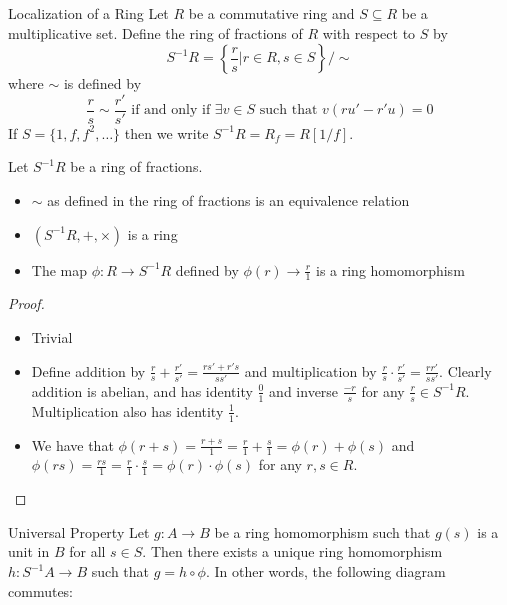 \documentclass[a4paper]{article}
\begin{document}
\begin{defn}{Localization of a Ring}{} Let $R$ be a commutative ring and $S\subseteq R$ be a multiplicative set. Define the ring of fractions of $R$ with respect to $S$ by $$S^{-1}R=\left\{\frac{r}{s}|r\in R,s\in S\right\}/\sim$$ where $\sim$ is defined by $$\frac{r}{s}\sim\frac{r'}{s'}\text{ if and only if }\exists v\in S\text{ such that }v(ru'-r'u)=0$$
If $S=\{1,f,f^2,\dots\}$ then we write $S^{-1}R=R_f=R[1/f]$. 
\end{defn}

\begin{prp}{}{} Let $S^{-1}R$ be a ring of fractions. 
\begin{itemize}
\item $\sim$ as defined in the ring of fractions is an equivalence relation
\item $(S^{-1}R,+,\times)$ is a ring
\item The map $\phi:R\to S^{-1}R$ defined by $\phi(r)\to\frac{r}{1}$ is a ring homomorphism
\end{itemize}\tcbline
\begin{proof}~\\
\begin{itemize}
\item Trivial
\item Define addition by $\frac{r}{s}+\frac{r'}{s'}=\frac{rs'+r's}{ss'}$ and multiplication by $\frac{r}{s}\cdot\frac{r'}{s'}=\frac{rr'}{ss'}$. Clearly addition is abelian, and has identity $\frac{0}{1}$ and inverse $\frac{-r}{s}$ for any $\frac{r}{s}\in S^{-1}R$. Multiplication also has identity $\frac{1}{1}$. 
\item We have that $\phi(r+s)=\frac{r+s}{1}=\frac{r}{1}+\frac{s}{1}=\phi(r)+\phi(s)$ and $\phi(rs)=\frac{rs}{1}=\frac{r}{1}\cdot\frac{s}{1}=\phi(r)\cdot\phi(s)$ for any $r,s\in R$. 
\end{itemize}
\end{proof}
\end{prp}

\begin{thm}{Universal Property}{} Let $g:A\to B$ be a ring homomorphism such that $g(s)$ is a unit in $B$ for all $s\in S$. Then there exists a unique ring homomorphism $h:S^{-1}A\to B$ such that $g=h\circ\phi$. In other words, the following diagram commutes: \\~\\
\end{thm}
\end{document}
